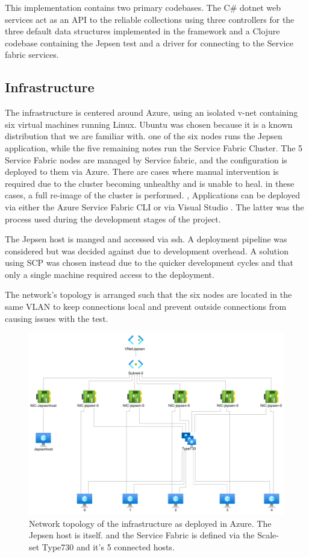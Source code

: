 \documentclass[a4paper,10pt,titlepage]{report}
\begin{document}
    This implementation contains two primary codebases. The C\# dotnet web services act as an API to the reliable collections using three controllers for the three default data structures implemented in the framework and a Clojure codebase containing the Jepsen test and a driver for connecting to the Service fabric services.

    \subsection{Infrastructure}
    The infrastructure is centered around Azure, using an isolated v-net containing six virtual machines running Linux. Ubuntu was chosen because it is a known distribution that we are familiar with. one of the six nodes runs the Jepsen application, while the five remaining notes run the Service Fabric Cluster.
    The 5 Service Fabric nodes are managed by Service fabric, and the configuration is deployed to them via Azure. There are cases where manual intervention is required due to the cluster becoming unhealthy and is unable to heal. in these cases, a full re-image of the cluster is performed. ,  Applications can be deployed via either the Azure Service Fabric CLI \cite{servicefabriccli} or via Visual Studio \cite{servicefabricguide}. The latter was the process used during the development stages of the project.

    The Jepsen host is manged and accessed via ssh. A deployment pipeline was considered but was decided against due to development overhead. A solution using SCP was chosen instead due to the quicker development cycles and that only a single machine required access to the deployment. 
    

    The network's topology is arranged such that the six nodes are located in the same VLAN to keep connections local and prevent outside connections from causing issues with the test.\\
    \begin{figure}[h!]
        \centering
        \includegraphics[scale=0.5]{images/azure_network_topology.png}
        \caption{Network topology of the infrastructure as deployed in Azure. The Jepsen host is itself. and the Service Fabric is defined via the Scale-set Type730 and it's 5 connected hosts.}
    \end{figure}
\end{document}
